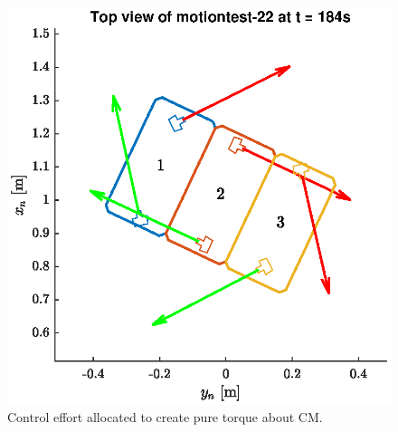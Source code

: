 \begin{figure}[H]
{\begin{minipage}{0.45\textwidth}
			\includegraphics[width=1\textwidth]{img/forceArrows_3x1_tp22_t184}
			\caption{Control effort allocated to create pure torque about CM.}
			\label{forceArrows_3x1_tp22_t184}
		\end{minipage}
	}
\end{figure}

